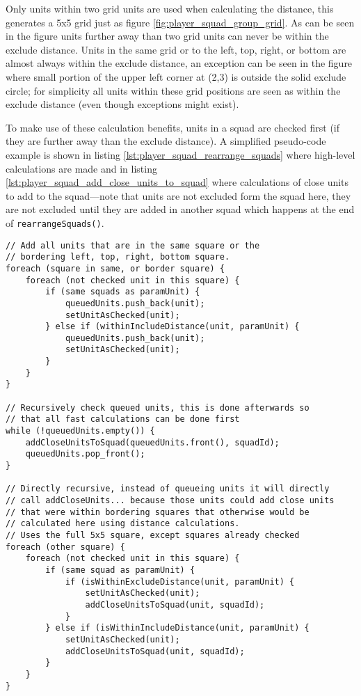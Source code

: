 Only units within two grid units are used when calculating the distance, this generates a 5x5 grid
just as figure \ref{fig:player_squad_group_grid}. As can be seen in the figure units further away
than two grid units can never be within the exclude distance. Units in the same grid or to the left,
top, right, or bottom are almost always within the exclude distance, an exception can be seen in the
figure where small portion of the upper left corner at (2,3) is outside the solid exclude circle;
for simplicity all units within these grid positions are seen as within the exclude distance (even
though exceptions might exist).

To make use of these calculation benefits, units in a squad are checked first (if they are further
away than the exclude distance). A simplified pseudo-code example is shown in listing
\ref{lst:player_squad_rearrange_squads} where high-level calculations are made and in listing
\ref{lst:player_squad_add_close_units_to_squad} where calculations of close units to add to the
squad—note that units are not excluded form the squad here, they are not excluded until they are
added in another squad which happens at the end of \texttt{rearrangeSquads()}.

\clearpage

\begin{lstlisting}[label={lst:player_squad_add_close_units_to_squad},caption={Pseudo-code of \texttt{addCloseUnitsToSquad()}}]
// Add all units that are in the same square or the
// bordering left, top, right, bottom square.
foreach (square in same, or border square) {
	foreach (not checked unit in this square) {
		if (same squads as paramUnit) {
			queuedUnits.push_back(unit);
			setUnitAsChecked(unit);
		} else if (withinIncludeDistance(unit, paramUnit) {
			queuedUnits.push_back(unit);
			setUnitAsChecked(unit);
		}
	}
}

// Recursively check queued units, this is done afterwards so
// that all fast calculations can be done first
while (!queuedUnits.empty()) {
	addCloseUnitsToSquad(queuedUnits.front(), squadId);
	queuedUnits.pop_front();
}

// Directly recursive, instead of queueing units it will directly
// call addCloseUnits... because those units could add close units
// that were within bordering squares that otherwise would be
// calculated here using distance calculations.
// Uses the full 5x5 square, except squares already checked
foreach (other square) {
	foreach (not checked unit in this square) {
		if (same squad as paramUnit) {
			if (isWithinExcludeDistance(unit, paramUnit) {
				setUnitAsChecked(unit);
				addCloseUnitsToSquad(unit, squadId);
			}
		} else if (isWithinIncludeDistance(unit, paramUnit) {
			setUnitAsChecked(unit);
			addCloseUnitsToSquad(unit, squadId);
		}
	}
}
\end{lstlisting}


